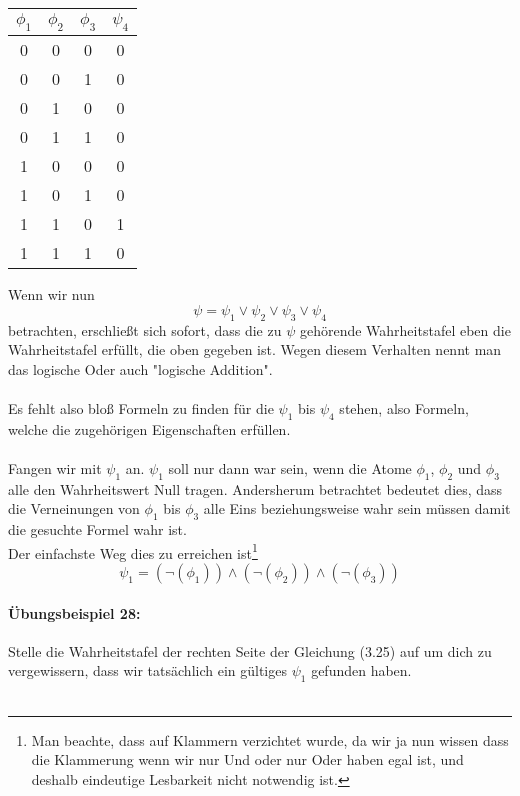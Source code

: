 \documentclass[11pt,a4paper,leqno]{report}
\numberwithin{equation}{chapter}
\begin{document}
\begin{center}
	\begin{minipage}{1.2in}
		\begin{tabular}{|c c c|c|}
			$\phi_1$ & $\phi_2$ & $\phi_3$ &$\psi_4$\\
			\hline
			0 & 0 & 0 & 0\\
			0 & 0 & 1 & 0\\
			0 & 1 & 0 & 0\\
			0 & 1 & 1 & 0\\
			1 & 0 & 0 & 0\\
			1 & 0 & 1 & 0\\
			1 & 1 & 0 & 1\\
			1 & 1 & 1 & 0\\
			\hline
		\end{tabular}  
	\end{minipage}
\end{center}
Wenn wir nun
\begin{equation}
	\psi = \psi_1\vee\psi_2\vee\psi_3\vee\psi_4
\end{equation}
betrachten, erschließt sich sofort, dass die zu $\psi$ gehörende Wahrheitstafel eben die Wahrheitstafel erfüllt, die oben gegeben ist. Wegen diesem Verhalten nennt man das logische Oder auch "logische Addition".\\
\\
Es fehlt also bloß Formeln zu finden für die $\psi_1$ bis $\psi_4$ stehen, also Formeln, welche die zugehörigen Eigenschaften erfüllen.\\
\\
Fangen wir mit $\psi_1$ an. $\psi_1$ soll nur dann war sein, wenn die Atome $\phi_1$, $\phi_2$ und $\phi_3$ alle den Wahrheitswert Null tragen. Andersherum betrachtet bedeutet dies, dass die Verneinungen von $\phi_1$ bis $\phi_3$ alle Eins beziehungsweise wahr sein müssen damit die gesuchte Formel wahr ist.\\
Der einfachste Weg dies zu erreichen ist\footnote{Man beachte, dass auf Klammern verzichtet wurde, da wir ja nun wissen dass die Klammerung wenn wir nur Und oder nur Oder haben egal ist, und deshalb eindeutige Lesbarkeit nicht notwendig ist.}
\begin{equation}
	\psi_1 = (\neg(\phi_1))\wedge(\neg(\phi_2))\wedge(\neg(\phi_3))
\end{equation}
\paragraph{Übungsbeispiel 28:} Stelle die Wahrheitstafel der rechten Seite der Gleichung (3.25) auf um dich zu vergewissern, dass wir tatsächlich ein gültiges $\psi_1$ gefunden haben.\\
\\
\end{document}
